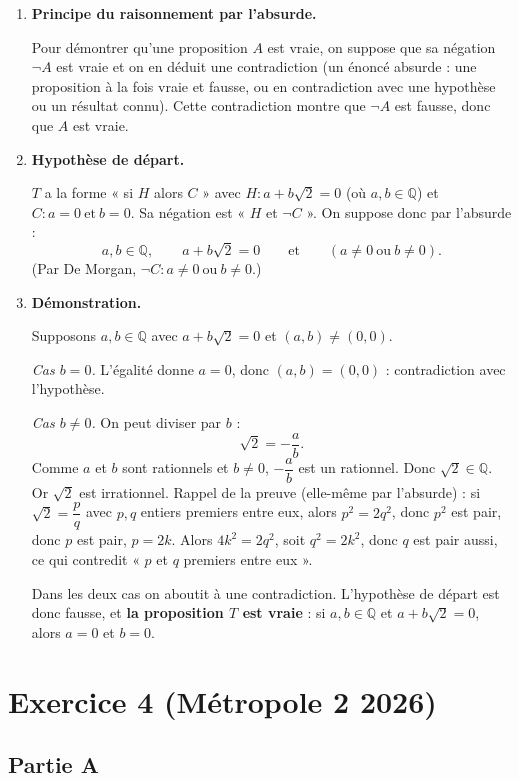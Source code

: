 \documentclass[11pt,a4paper]{article}
\newcommand{\exo}[1]{\section*{#1}}
\begin{document}
\begin{enumerate}

\item \textbf{Principe du raisonnement par l'absurde.}

Pour démontrer qu'une proposition $A$ est vraie, on suppose que sa négation $\neg A$ est vraie et on en
déduit une contradiction (un énoncé absurde : une proposition à la fois vraie et fausse, ou en contradiction
avec une hypothèse ou un résultat connu). Cette contradiction montre que $\neg A$ est fausse, donc que $A$ est vraie.

\item \textbf{Hypothèse de départ.}

$T$ a la forme « si $H$ alors $C$ » avec $H : a+b\sqrt2=0$ (où $a,b\in\mathbb{Q}$) et $C : a=0\ \text{et}\ b=0$.
Sa négation est « $H$ et $\neg C$ ». On suppose donc par l'absurde :
\[
a,b\in\mathbb{Q},\qquad a+b\sqrt2=0\qquad\text{et}\qquad (a\neq0\ \text{ou}\ b\neq0).
\]
(Par De Morgan, $\neg C : a\neq0\ \text{ou}\ b\neq0$.)

\item \textbf{Démonstration.}

Supposons $a,b\in\mathbb{Q}$ avec $a+b\sqrt2=0$ et $(a,b)\neq(0,0)$.

\emph{Cas $b=0$.} L'égalité donne $a=0$, donc $(a,b)=(0,0)$ : contradiction avec l'hypothèse.

\emph{Cas $b\neq0$.} On peut diviser par $b$ :
\[
\sqrt2=-\dfrac{a}{b}.
\]
Comme $a$ et $b$ sont rationnels et $b\neq0$, $-\dfrac ab$ est un rationnel. Donc $\sqrt2\in\mathbb{Q}$.
Or $\sqrt2$ est irrationnel. Rappel de la preuve (elle-même par l'absurde) : si $\sqrt2=\dfrac pq$ avec
$p,q$ entiers premiers entre eux, alors $p^2=2q^2$, donc $p^2$ est pair, donc $p$ est pair, $p=2k$.
Alors $4k^2=2q^2$, soit $q^2=2k^2$, donc $q$ est pair aussi, ce qui contredit « $p$ et $q$ premiers entre eux ».

Dans les deux cas on aboutit à une contradiction. L'hypothèse de départ est donc fausse, et
\textbf{la proposition $T$ est vraie} : si $a,b\in\mathbb{Q}$ et $a+b\sqrt2=0$, alors $a=0$ et $b=0$.
\end{enumerate}

\newpage
\exo{Exercice 4 (Métropole 2 2026)}

\subsection*{Partie A}
\end{document}
